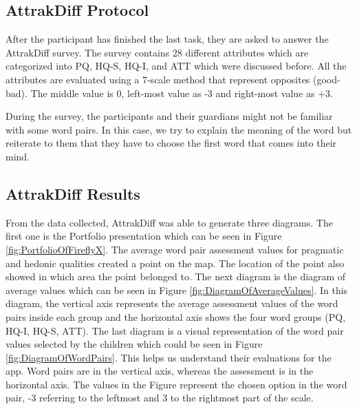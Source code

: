 \subsection{AttrakDiff Protocol}
After the participant has finished the last task, they are asked to answer the AttrakDiff survey. The survey contains 28 different attributes which are categorized into PQ, HQ-S, HQ-I, and ATT which were discussed before. All the attributes are evaluated using a 7-scale method that represent opposites (good-bad). The middle value is 0, left-most value as -3 and right-most value as +3.  

During the survey, the participants and their guardians might not be familiar with some word pairs. In this case, we try to explain the meaning of the word but reiterate to them that they have to choose the first word that comes into their mind.

\subsection{AttrakDiff Results}
From the data collected, AttrakDiff was able to generate three diagrams. The first one is the Portfolio presentation which can be seen in Figure \ref{fig:PortfolioOfFireflyX}. The average word pair assessment values for pragmatic and hedonic qualities created a point on the map. The location of the point also showed in which area the point belonged to. The next diagram is the diagram of average values which can be seen in Figure \ref{fig:DiagramOfAverageValues}. In this diagram, the vertical axis represents  the  average  assessment  values  of  the  word  pairs inside each group and the horizontal axis shows the four word groups (PQ, HQ-I, HQ-S, ATT). The last diagram is a visual representation of the word pair values selected by the children which could be seen in Figure \ref{fig:DiagramOfWordPairs}. This helps us understand their evaluations for the app. Word pairs are in the vertical axis, whereas the assessment is in the horizontal axis. The values in the Figure represent the chosen option in the word pair, -3 referring to the leftmost and 3 to the rightmost part of the scale. 


